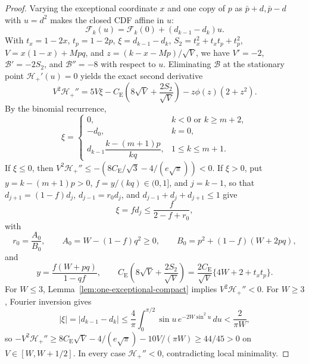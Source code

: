 \documentclass[11pt]{article}
\numberwithin{equation}{section}
\theoremstyle{definition}
\theoremstyle{remark}
\newcommand{\be}{C_{\mathrm E}}
\newcommand{\ph}{\phi}
\begin{document}
\begin{proof}
Varying the exceptional coordinate $x$ and one copy of $p$ as
$\bar p+d,\bar p-d$ with $u=d^2$ makes the closed CDF affine in $u$:
\begin{equation}
 \mathcal F_k(u)=\mathcal F_k(0)+(d_{k-1}-d_k)u.
 \label{eq:one-exceptional-pair-cdf-affinity}
\end{equation}
With $t_x=1-2x$, $t_p=1-2p$, $\xi=d_{k-1}-d_k$, $S_2=t_x^2+t_xt_p+t_p^2$,
$V=x(1-x)+Mpq$, and $z=(k-x-Mp)/\sqrt V$, we have $V'=-2$,
$\mathcal B'=-2S_2$, and $\mathcal B''=-8$ with respect to $u$. Eliminating
$\mathcal B$ at the stationary point $\mathcal H_+'(u)=0$ yields the exact
second derivative
\begin{equation}
 V^2\mathcal H_+''
 =5V\xi
 -\be\left(8\sqrt V+\frac{2S_2}{\sqrt V}\right)
 -z\ph(z)(2+z^2).
 \label{eq:one-exceptional-stationary-curvature}
\end{equation}
By the binomial recurrence,
\begin{equation}
 \xi=
 \begin{cases}
 0, & k<0\text{ or }k\geq m+2,\\
 -d_0, & k=0,\\
 d_{k-1}\dfrac{k-(m+1)p}{kq}, & 1\leq k\leq m+1.
 \end{cases}
 \label{eq:one-exceptional-rank-split}
\end{equation}
If $\xi\leq0$, then $V^2\mathcal H_+''\le-(8\be/\sqrt3-4/(e\sqrt\pi))<0$. If
$\xi>0$, put $y=k-(m+1)p>0$, $f=y/(kq)\in(0,1]$, and $j=k-1$, so that
$d_{j+1}=(1-f)d_j$, $d_{j-1}=r_0d_j$, and $d_{j-1}+d_j+d_{j+1}\le1$ give
\begin{equation}
 \xi=fd_j\leq\frac{f}{2-f+r_0},
 \label{eq:one-exceptional-three-neighbor}
\end{equation}
with
\begin{equation}
 r_0=\frac{A_0}{B_0},\qquad
 A_0=W-(1-f)q^2\ge0,\qquad
 B_0=p^2+(1-f)(W+2pq),
 \label{eq:one-exceptional-neighbor-elimination}
\end{equation}
and
\begin{equation}
 y=\frac{f(W+pq)}{1-qf},\qquad
 \be\left(8\sqrt V+\frac{2S_2}{\sqrt V}\right)
 =\frac{2\be}{\sqrt V}\{4W+2+t_xt_p\}.
 \label{eq:one-exceptional-phase-compression}
\end{equation}
For $W\leq3$, Lemma~\ref{lem:one-exceptional-compact} implies
$V^2\mathcal H_+''<0$. For $W\geq3$, Fourier inversion gives
\begin{equation}
 |\xi|=|d_{k-1}-d_k|
 \leq\frac4\pi\int_0^{\pi/2}\sin u\,e^{-2W\sin^2u}\,du
 <\frac2{\pi W},
 \label{eq:one-exceptional-fourier-tail}
\end{equation}
so $-V^2\mathcal H_+''\ge8\be\sqrt V-4/(e\sqrt\pi)-10V/(\pi W)\ge44/45>0$ on
$V\in[W,W+1/2]$. In every case $\mathcal H_+''<0$, contradicting local
minimality.
\end{proof}
\end{document}

